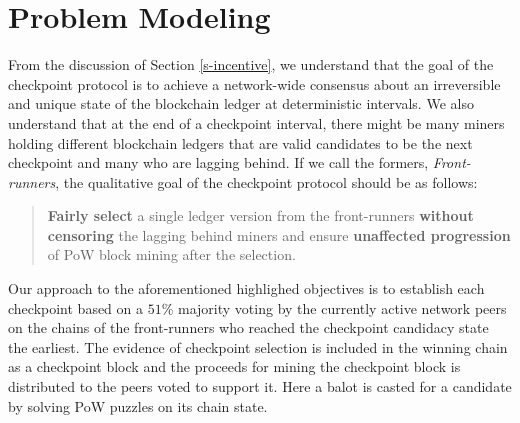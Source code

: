 \documentclass[conference]{IEEEtran}
\begin{document}


    

\section{Problem Modeling}
\label{s-model}
From the discussion of Section \ref{s-incentive}, we understand that the goal of the checkpoint protocol is to achieve a network-wide consensus about an irreversible and unique state of the blockchain ledger at deterministic intervals. We also understand that at the end of a checkpoint interval, there might be many miners holding different blockchain ledgers that are valid candidates to be the next checkpoint and many who are lagging behind. If we call the formers, \textit{Front-runners}, the qualitative goal of the checkpoint protocol should be as follows:

\begin{quote}
\textbf{Fairly select} a single ledger version from the front-runners \textbf{without censoring} the lagging behind miners and ensure \textbf{unaffected progression} of PoW block mining after the selection.  
\end{quote}

Our approach to the aforementioned highlighed objectives is to establish each checkpoint based on a $51\%$ majority voting by the currently active network peers on the chains of the front-runners who reached the checkpoint candidacy state the earliest. The evidence of checkpoint selection is included in the winning chain as a checkpoint block and the proceeds for mining the checkpoint block is distributed to the peers voted to support it. Here a balot is casted for a candidate by solving PoW puzzles on its chain state.
\end{document}
